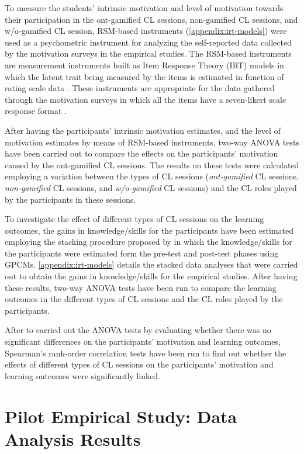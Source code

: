 To measure the students' intrinsic motivation and level of motivation towards their participation in the ont-gamified CL sessions, non-gamified CL sessions, and w/o-gamified CL session, RSM-based instruments (\autoref{appendix:irt-models}) were used as a psychometric instrument for analyzing the self-reported data collected by the motivation surveys in the empirical studies.
The RSM-based instruments are measurement instruments built as Item Response Theory (IRT) models in which the latent trait being measured by the items is estimated in function of rating scale data \cite{George2005}.
These instruments are appropriate for the data gathered through the motivation surveys in which all the items have a seven-likert scale response format \cite{VanderLindenHambleton2013}.

After having the participants' intrinsic motivation estimates, and the level of motivation estimates by means of RSM-based instruments, two-way ANOVA tests have been carried out to compare the effects on the participants' motivation caused by the ont-gamified CL sessions.
The results on these tests were calculated employing a variation between the types of CL sessions (\emph{ont-gamified} CL sessions, \emph{non-gamified} CL sessions, and \emph{w/o-gamified} CL sessions) and the CL roles played by the participants in these sessions.

To investigate the effect of different types of CL sessions on the learning outcomes, the gains in knowledge/skills for the participants have been estimated employing the stacking procedure proposed by  in which the knowledge/skills for the participants were estimated form the pre-test and post-test phases using GPCMs.
\autoref{appendix:irt-models} details the stacked data analyses that were carried out to obtain the gains in knowledge/skills for the empirical studies.
After having these results, two-way ANOVA tests have been run to compare the learning outcomes in the different types of CL sessions and the CL roles played by the participants.

After to carried out the ANOVA tests by evaluating whether there was no significant differences on the participants' motivation and learning outcomes, Spearman's rank-order correlation tests have been run to find out whether the effects of different types of CL sessions on the participants' motivation and learning outcomes were significantly linked.


\section{Pilot Empirical Study: Data Analysis Results}
\label{sec:pilot-study}

